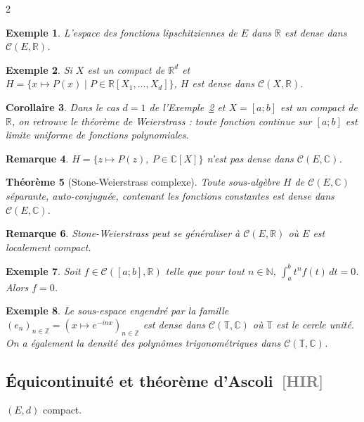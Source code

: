 \documentclass[10pt,a4paper]{article}
\theoremstyle{plan}
\newtheorem{theoreme}{Théorème}
\newtheorem{corollaire}[theoreme]{Corollaire}
\newtheorem{remarque}[theoreme]{Remarque}
\newtheorem{exemple}[theoreme]{Exemple}
\theoremstyle{planex}   %
\newcommand{\srcs}[1]{\ {\normalfont\small\textcolor{gray}{[#1]}}}
\newcommand{\R}{\mathbb{R}}
\newcommand{\C}{\mathbb{C}}
\newcommand{\N}{\mathbb{N}}
\newcommand{\Z}{\mathbb{Z}}
\newcommand{\T}{\mathbb{T}}
\newcommand{\Cc}{\mathcal{C}}
\begin{document}
\begin{multicols}{2}
\begin{exemple}
L'espace des fonctions lipschitziennes de $E$ dans $\R$ est dense dans $\Cc(E,\R)$.
\end{exemple}

\begin{exemple}\label{ex:polydense}
Si $X$ est un compact de $\R^d$ et $H = \{ x \mapsto P(x) \mid P \in \R[X_1, \dots, X_d] \}$, $H$ est dense dans $\Cc(X,\R)$.
\end{exemple}

\begin{corollaire}
Dans le cas $d = 1$ de l'Exemple~\ref{ex:polydense} et $X = [a;b]$ est un compact de $\R$, on retrouve le théorème de Weierstrass : toute fonction continue sur $[a;b]$ est limite uniforme de fonctions polynomiales.
\end{corollaire}

\begin{remarque}
$H = \{ z \mapsto P(z),\ P \in \C[X] \}$ n'est pas dense dans $\Cc(E,\C)$.
\end{remarque}

\begin{theoreme}[Stone-Weierstrass complexe]
Toute sous-algèbre $H$ de $\Cc(E,\C)$ séparante, auto-conjuguée, contenant les fonctions constantes est dense dans $\Cc(E,\C)$.
\end{theoreme}

\begin{remarque}
Stone-Weierstrass peut se généraliser à $\Cc(E,\R)$ où $E$ est localement compact.
\end{remarque}

\begin{exemple}
Soit $f \in \Cc([a;b],\R)$ telle que pour tout $n \in \N$, $\int_a^b t^n f(t)\,dt = 0$. Alors $f = 0$.
\end{exemple}

\begin{exemple} %
Le sous-espace engendré par la famille $(e_n)_{n \in \Z} = (x \mapsto e^{-inx})_{n \in \Z}$ est dense dans $\Cc(\T,\C)$ où $\T$ est le cercle unité. On a également la densité des polynômes trigonométriques dans $\Cc(\T,\C)$.
\end{exemple}

\subsection{Équicontinuité et théorème d'Ascoli\srcs{HIR}}
$(E,d)$ compact.


\end{multicols}
\end{document}
